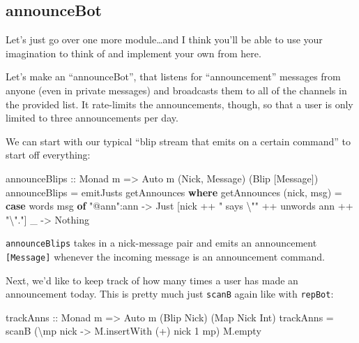 \documentclass[]{article}
\newenvironment{Shaded}{}{}
\newcommand{\DataTypeTok}[1]{\textcolor[rgb]{0.56,0.13,0.00}{#1}}
\newcommand{\DecValTok}[1]{\textcolor[rgb]{0.25,0.63,0.44}{#1}}
\newcommand{\FunctionTok}[1]{\textcolor[rgb]{0.02,0.16,0.49}{#1}}
\newcommand{\KeywordTok}[1]{\textcolor[rgb]{0.00,0.44,0.13}{\textbf{#1}}}
\newcommand{\NormalTok}[1]{#1}
\newcommand{\OperatorTok}[1]{\textcolor[rgb]{0.40,0.40,0.40}{#1}}
\newcommand{\OtherTok}[1]{\textcolor[rgb]{0.00,0.44,0.13}{#1}}
\newcommand{\StringTok}[1]{\textcolor[rgb]{0.25,0.44,0.63}{#1}}
\begin{document}
\hypertarget{announcebot}{%
\subsection{announceBot}\label{announcebot}}

Let's just go over one more module\ldots and I think you'll be able to use your
imagination to think of and implement your own from here.

Let's make an ``announceBot'', that listens for ``announcement'' messages from
anyone (even in private messages) and broadcasts them to all of the channels in
the provided list. It rate-limits the announcements, though, so that a user is
only limited to three announcements per day.

We can start with our typical ``blip stream that emits on a certain command'' to
start off everything:

\begin{Shaded}
\begin{Highlighting}[]
\OtherTok{announceBlips ::} \DataTypeTok{Monad}\NormalTok{ m }\OtherTok{=>} \DataTypeTok{Auto}\NormalTok{ m (}\DataTypeTok{Nick}\NormalTok{, }\DataTypeTok{Message}\NormalTok{) (}\DataTypeTok{Blip}\NormalTok{ [}\DataTypeTok{Message}\NormalTok{])}
\NormalTok{announceBlips }\OtherTok{=}\NormalTok{ emitJusts getAnnounces}
  \KeywordTok{where}
\NormalTok{    getAnnounces (nick, msg) }\OtherTok{=}
      \KeywordTok{case} \FunctionTok{words}\NormalTok{ msg }\KeywordTok{of}
        \StringTok{"@ann"}\OperatorTok{:}\NormalTok{ann }\OtherTok{{-}>} \DataTypeTok{Just}\NormalTok{ [nick }\OperatorTok{++} \StringTok{" says \textbackslash{}""} \OperatorTok{++} \FunctionTok{unwords}\NormalTok{ ann }\OperatorTok{++} \StringTok{"\textbackslash{}"."}\NormalTok{]}
\NormalTok{        \_          }\OtherTok{{-}>} \DataTypeTok{Nothing}
\end{Highlighting}
\end{Shaded}

\texttt{announceBlips} takes in a nick-message pair and emits an announcement
\texttt{{[}Message{]}} whenever the incoming message is an announcement command.

Next, we'd like to keep track of how many times a user has made an announcement
today. This is pretty much just \texttt{scanB} again like with \texttt{repBot}:

\begin{Shaded}
\begin{Highlighting}[]
\OtherTok{trackAnns ::} \DataTypeTok{Monad}\NormalTok{ m }\OtherTok{=>} \DataTypeTok{Auto}\NormalTok{ m (}\DataTypeTok{Blip} \DataTypeTok{Nick}\NormalTok{) (}\DataTypeTok{Map} \DataTypeTok{Nick} \DataTypeTok{Int}\NormalTok{)}
\NormalTok{trackAnns }\OtherTok{=}\NormalTok{ scanB (\textbackslash{}mp nick }\OtherTok{{-}>}\NormalTok{ M.insertWith (}\OperatorTok{+}\NormalTok{) nick }\DecValTok{1}\NormalTok{ mp) M.empty}
\end{Highlighting}
\end{Shaded}
\end{document}
